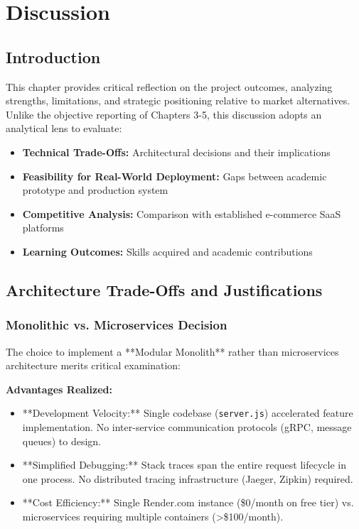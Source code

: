 \documentclass[12pt, a4paper]{report}
\begin{document}

\chapter{Discussion}

\section{Introduction}

This chapter provides critical reflection on the project outcomes, analyzing strengths, limitations, and strategic positioning relative to market alternatives. Unlike the objective reporting of Chapters 3-5, this discussion adopts an analytical lens to evaluate:

\begin{itemize}
    \item \textbf{Technical Trade-Offs:} Architectural decisions and their implications
    \item \textbf{Feasibility for Real-World Deployment:} Gaps between academic prototype and production system
    \item \textbf{Competitive Analysis:} Comparison with established e-commerce SaaS platforms
    \item \textbf{Learning Outcomes:} Skills acquired and academic contributions
\end{itemize}

\section{Architecture Trade-Offs and Justifications}

\subsection{Monolithic vs. Microservices Decision}

The choice to implement a **Modular Monolith** rather than microservices architecture merits critical examination:

\textbf{Advantages Realized:}
\begin{itemize}
    \item **Development Velocity:** Single codebase (\texttt{server.js}) accelerated feature implementation. No inter-service communication protocols (gRPC, message queues) to design.
    \item **Simplified Debugging:** Stack traces span the entire request lifecycle in one process. No distributed tracing infrastructure (Jaeger, Zipkin) required.
    \item **Cost Efficiency:** Single Render.com instance (\$0/month on free tier) vs. microservices requiring multiple containers (\textgreater \$100/month).
\end{itemize}
\end{document}

